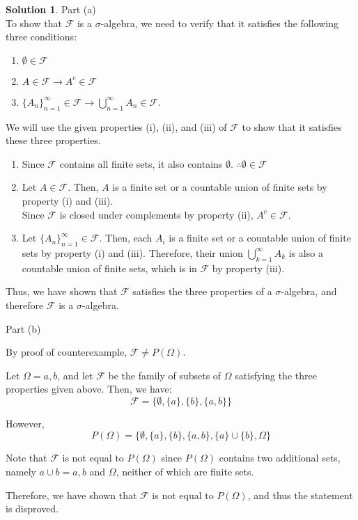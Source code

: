 \documentclass{article}
\theoremstyle{definition}
\newtheorem*{solution}{Solution}
\begin{document}
\begin{solution}
Part (a)\\
\noindent
To show that $\mathcal{F}$ is a $\sigma$-algebra, we need to verify that it satisfies the following three conditions:
\begin{enumerate}
\item $\emptyset\in\mathcal{F}$
\item $A\in\mathcal{F}\to A^c\in\mathcal{F}$
\item $\{A_n\}_{n=1}^{\infty}\in\mathcal{F}\to\bigcup\limits_{n=1}^{\infty}A_n\in\mathcal{F}$.
\end{enumerate}
We will use the given properties (i), (ii), and (iii) of $\mathcal{F}$ to show that it satisfies these three properties.

\begin{enumerate}
\item Since $\mathcal{F}$ contains all finite sets, it also contains $\emptyset$. $\therefore\emptyset\in\mathcal{F}$
\item Let $A\in\mathcal{F}$. Then, $A$ is a finite set or a countable union of finite sets by property (i) and (iii).\\
Since $\mathcal{F}$ is closed under complements by property (ii), $A^c\in\mathcal{F}$.
\item Let $\{A_n\}_{n=1}^{\infty}\in\mathcal{F}$. Then, each $A_i$ is a finite set or a countable union of finite sets by property (i) and (iii). Therefore, their union $\bigcup\limits_{k=1}^{\infty} A_k$ is also a countable union of finite sets, which is in $\mathcal{F}$ by property (iii).
\end{enumerate}
Thus, we have shown that $\mathcal{F}$ satisfies the three properties of a $\sigma$-algebra, and therefore $\mathcal{F}$ is a $\sigma$-algebra.

\clearpage
\noindent
Part (b)

\noindent
By proof of counterexample, $\mathcal{F}\neq P(\Omega)$.

\noindent
Let $\Omega = {a, b}$, and let $\mathcal{F}$ be the family of subsets of $\Omega$ satisfying the three properties given above. Then, we have:
\[
\mathcal{F} = \{\emptyset, \{a\}, \{b\}, \{a, b\}\}
\]

\noindent
However,
\[P(\Omega)=\{\emptyset, \{a\}, \{b\}, \{a,b\}, \{a\}\cup\{b\}, \Omega\}\]

\noindent
Note that $\mathcal{F}$ is not equal to $P(\Omega)$ since $P(\Omega)$ contains two additional sets, namely ${a}\cup{b} = {a,b}$ and $\Omega$, neither of which are finite sets.

\noindent
Therefore, we have shown that $\mathcal{F}$ is not equal to $P(\Omega)$, and thus the statement is disproved.
\end{solution}
\end{document}
